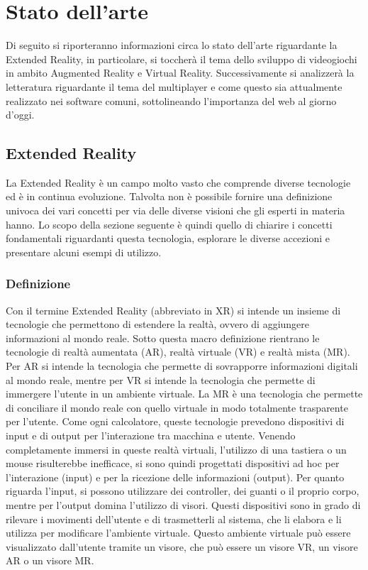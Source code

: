\chapter{Stato dell'arte}\label{chap:Letteratura}
Di seguito si riporteranno informazioni circa lo stato dell'arte riguardante la Extended Reality, in particolare, si toccherà il tema dello sviluppo di videogiochi in ambito 
Augmented Reality e Virtual Reality. Successivamente si analizzerà la letteratura riguardante il tema del multiplayer e come questo sia attualmente realizzato nei software comuni,
sottolineando l'importanza del web al giorno d'oggi.

\section{Extended Reality}\label{sec:XR}
    La Extended Reality è un campo molto vasto che comprende diverse tecnologie ed è in continua evoluzione. Talvolta non è possibile fornire una definizione univoca dei vari 
    concetti per via delle diverse visioni che gli esperti in materia hanno. Lo scopo della sezione seguente è quindi quello di chiarire i concetti fondamentali riguardanti
    questa tecnologia, esplorare le diverse accezioni e presentare alcuni esempi di utilizzo.
    \subsection{Definizione}\label{subsec:XRDef}
        Con il termine Extended Reality (abbreviato in XR) si intende un insieme di tecnologie che permettono di estendere la realtà, ovvero di aggiungere informazioni al mondo 
        reale. Sotto questa macro definizione rientrano le tecnologie di realtà aumentata (AR), realtà virtuale (VR) e realtà mista (MR). Per AR si intende la tecnologia che permette 
        di sovrapporre informazioni digitali al mondo reale, mentre per VR si intende la tecnologia che permette di immergere l'utente in un ambiente virtuale. La MR è una tecnologia
        che permette di conciliare il mondo reale con quello virtuale in modo totalmente trasparente per l'utente. Come ogni calcolatore, queste tecnologie prevedono dispositivi 
        di input e di output per l'interazione tra macchina e utente. Venendo completamente immersi in queste realtà virtuali, l'utilizzo di una tastiera o un mouse risulterebbe
        inefficace, si sono quindi progettati dispositivi ad hoc per l'interazione (input) e per la ricezione delle informazioni (output). Per quanto riguarda l'input, si possono
        utilizzare dei controller, dei guanti o il proprio corpo, mentre per l'output domina l'utilizzo di visori. Questi dispositivi sono in grado di rilevare i movimenti 
        dell'utente e di trasmetterli al sistema, che li elabora e li utilizza per modificare l'ambiente virtuale. Questo ambiente virtuale può essere visualizzato dall'utente 
        tramite un visore, che può essere un visore VR, un visore AR o un visore MR.
